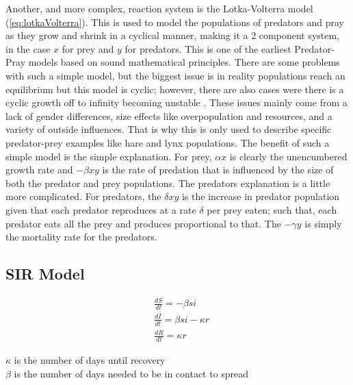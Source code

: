 \documentclass[12pt, letterpaper]{article}
\begin{document}
Another, and more complex, reaction system is the Lotka-Volterra model (\ref{eq:lotkaVolterra}). This is used
to model the populations of predators and pray as they grow and shrink in a cyclical manner, making it a 2
component system, in the case $x$ for prey and $y$ for predators. This is one of the earliest Predator-Pray
models based on sound mathematical principles. There are some problems with such a simple model, but the
biggest issue is in reality populations reach an equilibrium but this model is cyclic; however, there are
also cases were there is a cyclic growth off to infinity becoming unstable \citep{lotkaVolterra}. These
issues mainly come from a lack of 
gender differences, size effects like overpopulation and resources, and a variety of outside influences. That
is why this is only used to describe specific predator-prey examples like hare and lynx populations. The
benefit of such a simple model is the simple explanation. For prey, $\alpha x$ is clearly the unencumbered
growth rate and $-\beta x y$ is the rate of predation that is influenced by the size of both the predator and
prey populations. The predators explanation is a little more complicated. For predators, the $\delta x y$ is
the increase in predator population given that each predator reproduces at a rate $\delta$ per prey eaten; 
such that, each predator eats all the prey and produces proportional to that. The $- \gamma y$ is simply the
mortality rate for the predators.

\subsection{SIR Model} \label{sir}
\begin{singlespace}
  \begin{equation}\label{eq:SIR}
    \begin{split}
      &\frac{dS}{dt} = -\beta s i \\
      &\frac{dI}{dt} = \beta s i - \kappa r \\
      &\frac{dR}{dt} = \kappa r
    \end{split}
  \end{equation}
  \begin{small}
$\kappa$ is the number of days until recovery \\
$\beta$ is the number of days needed to be in contact to spread
  \end{small}
\end{singlespace}
\end{document}
